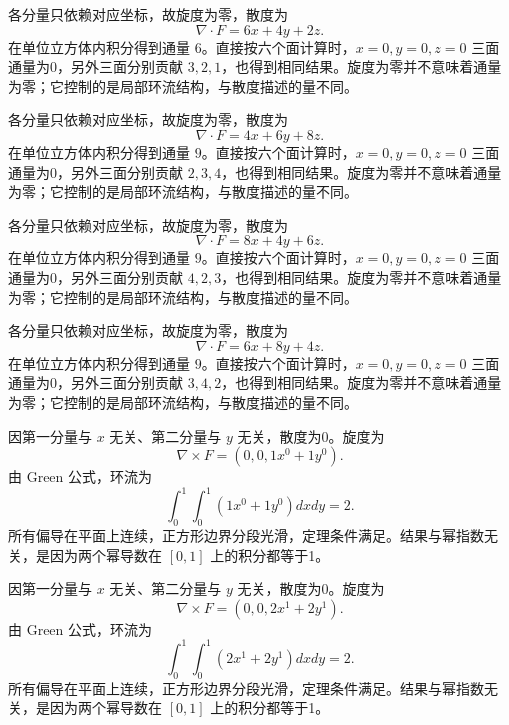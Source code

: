 \documentclass[12pt,fontset=fandol]{ctexart}
\begin{document}
\begin{solve}\label{ans:c44q3}
各分量只依赖对应坐标，故旋度为零，散度为
\[
\nabla\cdot F=6x+4y+2z.
\]
在单位立方体内积分得到通量 $6$。直接按六个面计算时，$x=0,y=0,z=0$ 三面通量为0，另外三面分别贡献 $3,2,1$，也得到相同结果。旋度为零并不意味着通量为零；它控制的是局部环流结构，与散度描述的量不同。
\end{solve}

\begin{solve}\label{ans:c44q4}
各分量只依赖对应坐标，故旋度为零，散度为
\[
\nabla\cdot F=4x+6y+8z.
\]
在单位立方体内积分得到通量 $9$。直接按六个面计算时，$x=0,y=0,z=0$ 三面通量为0，另外三面分别贡献 $2,3,4$，也得到相同结果。旋度为零并不意味着通量为零；它控制的是局部环流结构，与散度描述的量不同。
\end{solve}

\begin{solve}\label{ans:c44q5}
各分量只依赖对应坐标，故旋度为零，散度为
\[
\nabla\cdot F=8x+4y+6z.
\]
在单位立方体内积分得到通量 $9$。直接按六个面计算时，$x=0,y=0,z=0$ 三面通量为0，另外三面分别贡献 $4,2,3$，也得到相同结果。旋度为零并不意味着通量为零；它控制的是局部环流结构，与散度描述的量不同。
\end{solve}

\begin{solve}\label{ans:c44q6}
各分量只依赖对应坐标，故旋度为零，散度为
\[
\nabla\cdot F=6x+8y+4z.
\]
在单位立方体内积分得到通量 $9$。直接按六个面计算时，$x=0,y=0,z=0$ 三面通量为0，另外三面分别贡献 $3,4,2$，也得到相同结果。旋度为零并不意味着通量为零；它控制的是局部环流结构，与散度描述的量不同。
\end{solve}

\begin{solve}\label{ans:c44q7}
因第一分量与 $x$ 无关、第二分量与 $y$ 无关，散度为0。旋度为
\[
\nabla\times F=(0,0,1x^{0}+1y^{0}).
\]
由 Green 公式，环流为
\[
\int_0^1\int_0^1(1x^{0}+1y^{0})dxdy=2.
\]
所有偏导在平面上连续，正方形边界分段光滑，定理条件满足。结果与幂指数无关，是因为两个幂导数在 $[0,1]$ 上的积分都等于1。
\end{solve}

\begin{solve}\label{ans:c44q8}
因第一分量与 $x$ 无关、第二分量与 $y$ 无关，散度为0。旋度为
\[
\nabla\times F=(0,0,2x^{1}+2y^{1}).
\]
由 Green 公式，环流为
\[
\int_0^1\int_0^1(2x^{1}+2y^{1})dxdy=2.
\]
所有偏导在平面上连续，正方形边界分段光滑，定理条件满足。结果与幂指数无关，是因为两个幂导数在 $[0,1]$ 上的积分都等于1。
\end{solve}
\end{document}
